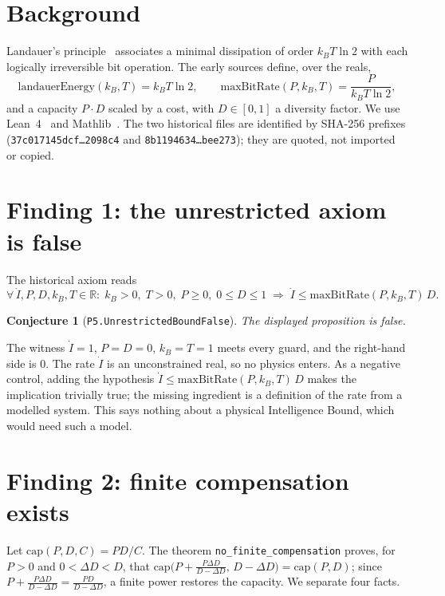 \documentclass[11pt]{article}
\newtheorem{conjecture}{Conjecture}
\theoremstyle{remark}
\begin{document}
\section{Background}
Landauer's principle~\citep{landauer1961} associates a minimal dissipation of order $k_B T\ln 2$
with each logically irreversible bit operation. The early sources define, over the reals,
\[
  \mathrm{landauerEnergy}(k_B,T)=k_B T\ln 2,\qquad
  \mathrm{maxBitRate}(P,k_B,T)=\frac{P}{k_B T\ln 2},
\]
and a capacity $P\cdot D$ scaled by a cost, with $D\in[0,1]$ a diversity factor. We use
Lean~4~\citep{lean4} and Mathlib~\citep{mathlib2020}. The two historical files are identified by
SHA-256 prefixes (\texttt{37c017145dcf\ldots2098c4} and \texttt{8b1194634\ldots bee273}); they
are quoted, not imported or copied.

\section{Finding 1: the unrestricted axiom is false}
The historical axiom reads
\[
  \forall\,\dot I,P,D,k_B,T\in\mathbb{R}:\;
  k_B>0,\;T>0,\;P\ge0,\;0\le D\le1\;\Longrightarrow\;\dot I\le \mathrm{maxBitRate}(P,k_B,T)\,D .
\]
\begin{conjecture}[\texttt{P5.UnrestrictedBoundFalse}]
The displayed proposition is false.
\end{conjecture}
\noindent The witness $\dot I=1$, $P=D=0$, $k_B=T=1$ meets every guard, and the right-hand side
is $0$. The rate $\dot I$ is an unconstrained real, so no physics enters. As a negative control,
adding the hypothesis $\dot I\le\mathrm{maxBitRate}(P,k_B,T)\,D$ makes the implication trivially
true; the missing ingredient is a definition of the rate from a modelled system. This says
nothing about a physical Intelligence Bound, which would need such a model.

\section{Finding 2: finite compensation exists}
Let $\mathrm{cap}(P,D,C)=PD/C$. The theorem \texttt{no\_finite\_compensation} proves, for
$P>0$ and $0<\Delta D<D$, that
$\mathrm{cap}\bigl(P+\tfrac{P\Delta D}{D-\Delta D},\,D-\Delta D\bigr)=\mathrm{cap}(P,D)$; since
$P+\frac{P\Delta D}{D-\Delta D}=\frac{PD}{D-\Delta D}$, a finite power restores the capacity.
We separate four facts.
\end{document}
